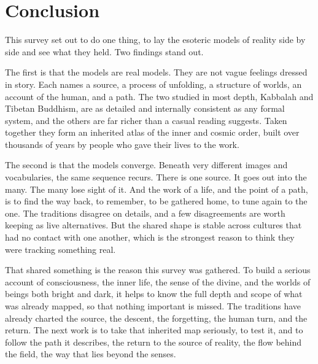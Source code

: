 \chapter{Conclusion}

This survey set out to do one thing, to lay the esoteric models of reality side by side and see what they
held. Two findings stand out.

The first is that the models are real models. They are not vague feelings dressed in story. Each names a
source, a process of unfolding, a structure of worlds, an account of the human, and a path. The two studied
in most depth, Kabbalah and Tibetan Buddhism, are as detailed and internally consistent as any formal system,
and the others are far richer than a casual reading suggests. Taken together they form an inherited atlas of
the inner and cosmic order, built over thousands of years by people who gave their lives to the work.

The second is that the models converge. Beneath very different images and vocabularies, the same sequence
recurs. There is one source. It goes out into the many. The many lose sight of it. And the work of a life,
and the point of a path, is to find the way back, to remember, to be gathered home, to tune again to the one.
The traditions disagree on details, and a few disagreements are worth keeping as live alternatives. But the
shared shape is stable across cultures that had no contact with one another, which is the strongest reason to
think they were tracking something real.

That shared something is the reason this survey was gathered. To build a serious account of consciousness,
the inner life, the sense of the divine, and the worlds of beings both bright and dark, it helps to know the
full depth and scope of what was already mapped, so that nothing important is missed. The traditions have
already charted the source, the descent, the forgetting, the human turn, and the return. The next work is to
take that inherited map seriously, to test it, and to follow the path it describes, the return to the source
of reality, the flow behind the field, the way that lies beyond the senses.
